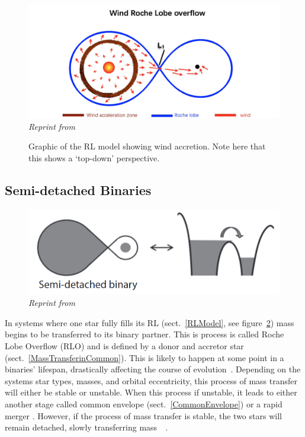 \documentclass[12pt, a4paper]{article}
\begin{document}
        \begin{figure}[H]
            \centering
            \includegraphics[width = .8\textwidth]{figs/reused-figs/Tauris_WindRocheLobeOverflow.png}\\
            \textit{Reprint from~\parencite{TaurisvandenHeuvel+2023}}
            \caption{Graphic of the RL model showing wind accretion. Note here that this shows a `top-down' perspective.}
            \label{fig:RLWindAccretion}
        \end{figure}
        
        \subsection{Semi-detached Binaries}\label{RLO} %

        \begin{figure}[H] 
            \centering
            \includegraphics[scale = .4]{figs/reused-figs/Tauris_Semi-detachedBinary.png}
            \caption{\textit{Reprint from~\parencite{TaurisvandenHeuvel+2023}}}
            \label{SemidetachedRL}
        \end{figure}

        In systems where one star fully fills its RL (sect.~\ref{RLModel}, see figure~\ref{SemidetachedRL}) mass begins to be transferred to its binary partner. This is process is called Roche Lobe Overflow (RLO) and is defined by a donor and accretor star (sect.~\ref{MassTransferinCommon}). This is likely to happen at some point in a binaries' lifespan, drastically affecting the course of evolution~\parencite{TaurisvandenHeuvel+2023}\parencite{Chen_2024}. Depending on the systems star types, masses, and orbital eccentricity, this process of mass transfer will either be stable or unstable. When this process if unstable, it leads to either another stage called common envelope (sect.~\ref{CommonEnvelope}) or a rapid merger \parencite{TaurisvandenHeuvel+2023}. However, if the process of mass transfer is stable, the two stars will remain detached, slowly transferring mass~\parencite{Chen_2024}~\parencite{TaurisvandenHeuvel+2023}.
\end{document}
